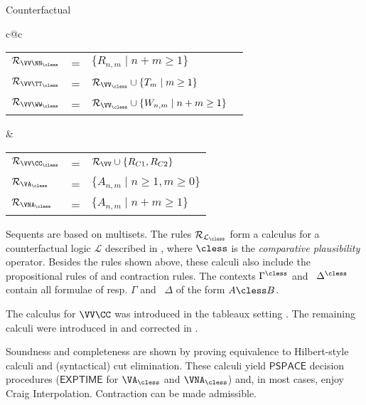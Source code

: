 \begin{entry}{Counterfactual}
\begin{calculus}
\begin{small}
\begin{center}
\begin{tabular}{c@{\qquad}c}
  \\
\begin{tabular}{lll}
$\Rules_{\VV\NN_\cless}$ & = & $\{ R_{n,m} \mid n+m \geq 1\}$\\
$\Rules_{\VV\TT_\cless}$ & = & $\Rules_{\VV_\cless}\cup \{T_m \mid m \geq 1\}$\\
$\Rules_{\VV\WW_\cless}$ & = &$\Rules_{\VV_\cless}\cup \{W_{n,m}\mid n
+ m \geq 1\}\quad$
\end{tabular} &
\begin{tabular}{lll}
$\Rules_{\VV\CC_\cless}$ & = & $\Rules_\VV\cup\{R_{C1},R_{C2}\}$\\
$\Rules_{\VA_\cless}$ & = & $\{ A_{n,m} \mid n\geq 1, m\geq 0 \}$\\
$\Rules_{\VNA_\cless}$ & = & $\{ A_{n,m} \mid n + m\geq 1 \}$
\end{tabular}
\end{tabular}
\end{center}

\end{small}
\end{calculus}


\begin{clarifications}
  Sequents are based on multisets. The rules $\Rules_{\mathcal{L}_\cless}$ 
  form a calculus for a counterfactual logic $\mathcal{L}$ described 
  in \cite{Lewis:1973uq}, where $\cless$ is the \emph{comparative plausibility} 
  operator. Besides the rules shown above, these calculi also include the 
  propositional rules of
  \Gtc {} and contraction rules. The contexts $\Gamma^\cless$ and \
  $\Delta^\cless$ contain all formulae of resp. $\Gamma$ and \ $\Delta$ of
  the form $A \cless B$.
\end{clarifications}

\begin{history}
  The calculus for $\VV\CC$ was introduced in the tableaux setting
  \cite{Swart:1983uq,Gent:1992p3090}. The remaining calculi were
  introduced in \cite{Lellmann:2012fk,Lellmann:2013fk} and corrected
  in \cite{Lellmann:2013}.
\end{history}

\begin{technicalities}
  Soundness and completeness are shown by proving equivalence to 
  Hilbert-style calculi and (syntactical) cut elimination. 
  These calculi yield $\mathsf{PSPACE}$ decision
  procedures ($\mathsf{EXPTIME}$ for $\VA_\cless$ and
  $\VNA_\cless$) and, in most cases, enjoy Craig Interpolation. 
  Contraction can be made admissible. %
\end{technicalities}

\vspace{-5pt}

\end{entry}

